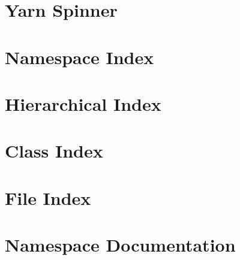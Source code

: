 \documentclass[twoside]{book}
\begin{document}
\chapter{Yarn Spinner}
\label{d7/d7a/a00016}
\hypertarget{d7/d7a/a00016}{}

\chapter{Namespace Index}

\chapter{Hierarchical Index}

\chapter{Class Index}

\chapter{File Index}

\chapter{Namespace Documentation}













\end{document}
